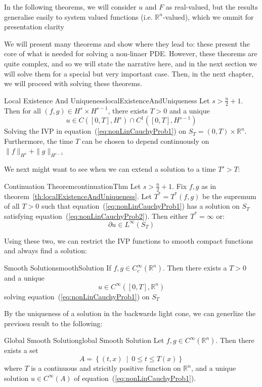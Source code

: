 \documentclass{book}
\newcommand{\R}{{\mathbb{R}}}
\newcommand{\set}[2]{\left\{#1 \ \middle|\ #2\right\}}
\begin{document}
In the following theorems, we will consider $u$ and $F$ as real-valued, but the results generalise easily to system
valued functions (i.e. $\R^n$-valued), which we ommit for presentation clarity

We will present many theorems and show where they lead to: these present the core of what is needed for solving
a non-linaer PDE. However, these theorems are quite complex, and so we will state the narrative here, and in the next
section we will solve them for a special but very important case. Then, in the next chapter, we will proceed with
solving these theorems.

\begin{thm}{Local Existence And Uniqueness}{localExistenceAndUniqueness}
	Let $s > \frac{n}{2} +1$. Then for all $(f,g) \in H^s\times H^{s-1}$, there exists $T> 0$ and a unique
	\[
		u \in C([0,T], H^s)\cap C^1([0,T], H^{s-1})
	\]
	Solving the IVP in equation~(\ref{eq:nonLinCauchyProb1}) on $S_T = (0,T)\times \R^n$. Furthermore, the time $T$ can
	be chosen to depend continuously on $\|f\|_{H^s} + \|g\|_{H^{s-1}}$
\end{thm}

We next might want to see when we can extend a solution to a time $T' > T$:
\begin{thm}{Continuation Theorem}{continuationThm}
	Let $s > \frac{n}{2} + 1$. Fix $f,g$ as in theorem~\ref{th:localExistenceAndUniqueness}. Let $T^* = T^*(f,g)$ be the
	supremum of all $T> 0$ such that equation~(\ref{eq:nonLinCauchyProb1}) has a solution on $S_T$ satisfying
	equation~(\ref{eq:nonLinCauchyProb2}). Then either $T^* = \infty$ or:
	\[
		 \partial u \in L^\infty(S_T)
	 \]
\end{thm}

Using these two, we can restrict the IVP functions to smooth compact functions and always find a solution:

\begin{thm}{Smooth Solution}{smoothSolution}
	If $f,g \in C_c^\infty(\R^n)$. Then there exists a $T > 0$ and a unique
	\[
		u \in C^\infty([0,T], \R^n)
	\]
	solving equation~(\ref{eq:nonLinCauchyProb1}) on $S_T$
\end{thm}

By the uniqueness of a solution in the backwards light cone, we can generlize the previosu result to the following:

\begin{cor}{Global Smooth Solution}{global Smooth Solution}
	Let $f,g \in C^\infty(\R^n)$. Then there exists a set
	\[
		A = \set{(t,x)}{0 \le t \le T(x)}
	\]
	where $T$ is a continuous and stricitly positive function on $\R^n$, and a unique solution $u \in C^\infty(A)$ of
	equation~(\ref{eq:nonLinCauchyProb1}).
\end{cor}
\end{document}
